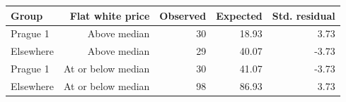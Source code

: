 \begin{tabular}{lrrrr}
\toprule
Group & Flat white price & Observed & Expected & Std. residual \\
\midrule
Prague 1 & Above median & 30 & 18.93 & 3.73 \\
Elsewhere & Above median & 29 & 40.07 & -3.73 \\
Prague 1 & At or below median & 30 & 41.07 & -3.73 \\
Elsewhere & At or below median & 98 & 86.93 & 3.73 \\
\bottomrule
\end{tabular}
